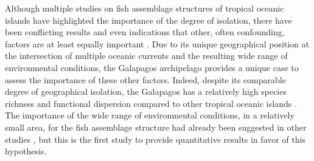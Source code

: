 Although multiple studies on fish assemblage structures of tropical oceanic islands have highlighted the importance of the degree of isolation, there have been conflicting results and even indications that other, often confounding, factors are at least equally important \citep{Hobbs2011ExtinctionFishes,Luiz2015CommunityVariables,Quimbayo2019DeterminantsIslands}. Due to its unique geographical position at the intersection of multiple oceanic currents and the resulting wide range of environmental conditions, the Galapagos archipelago provides a unique case to assess the importance of these other factors. Indeed, despite its comparable degree of geographical isolation, the Galapagos has a relatively high species richness and functional dispersion compared to other tropical oceanic islands \citep{Giddens2019PatternsPacific,Quimbayo2019DeterminantsIslands}. The importance of the wide range of environmental conditions, in a relatively small area, for the fish assemblage structure had already been suggested in other studies \citep{Edgar2004,Stuart-Smith2013IntegratingDiversity}, but this is the first study to provide quantitative results in favor of this hypothesis. 





